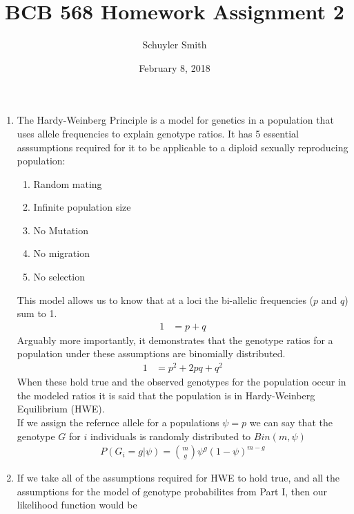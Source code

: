 \documentclass[12pt]{article}
\numberwithin{theorem}{subsection}
\theoremstyle{definition}
\numberwithin{definition}{subsection}
\numberwithin{corollary}{subsection}
\theoremstyle{remark}
\begin{document}
\setlength{\parindent}{0pt}
\title{BCB 568 Homework Assignment 2}
\author{Schuyler Smith}
\date{February 8, 2018}
 \maketitle

\begin{enumerate}[label=\textbf{\arabic*.}, start=6]

    \item The Hardy-Weinberg Principle is a model for genetics in a population that uses allele frequencies to explain genotype ratios. It has 5 essential asssumptions required for it to be applicable to a diploid sexually reproducing population:
    \begin{enumerate}[label=\textbf{\arabic*.}]
        \item Random mating
        \item Infinite population size
        \item No Mutation
        \item No migration
        \item No selection
    \end{enumerate}
    This model allows us to know that at a loci the bi-allelic frequencies ($p$ and $q$) sum to 1.
        \begin{align*}
            1   &= p + q
        \end{align*} 
    Arguably more importantly, it demonstrates that the genotype ratios for a population under these assumptions are binomially distributed.
        \begin{align*}
            1   &= p^2 + 2pq + q^2
        \end{align*}
    When these hold true and the observed genotypes for the population occur in the modeled ratios it is said that the population is in Hardy-Weinberg Equilibrium (HWE).\\
    If we assign the refernce allele for a populations $\psi=p$ we can say that the genotype $G$ for $i$ individuals is randomly distributed to $Bin(m,\psi)$
        \begin{align*}
            P(G_i = g | \psi) = \binom{m}{g}\psi^g(1- \psi)^{m - g}
        \end{align*}
    \newpage
    \item If we take all of the assumptions required for HWE to hold true, and all the assumptions for the model of genotype probabilites from Part I, then our likelihood function would be
        \begin{align*}

\end{align*}
\end{enumerate}
\end{document}

